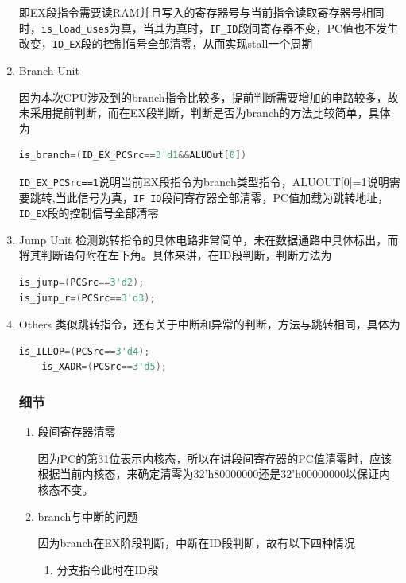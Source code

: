 \documentclass{ctexart}
\begin{document}
\begin{enumerate}
即EX段指令需要读RAM并且写入的寄存器号与当前指令读取寄存器号相同时，\verb"is_load_uses"为真，当其为真时，\verb"IF_ID"段间寄存器不变，PC值也不发生改变，\verb"ID_EX"段的控制信号全部清零，从而实现stall一个周期

	\item Branch Unit

因为本次CPU涉及到的branch指令比较多，提前判断需要增加的电路较多，故未采用提前判断，而在EX段判断，判断是否为branch的方法比较简单，具体为

\begin{lstlisting}[language = verilog]
is_branch=(ID_EX_PCSrc==3'd1&&ALUOut[0])
\end{lstlisting}

\verb"ID_EX_PCSrc==1"说明当前EX段指令为branch类型指令，ALUOUT[0]=1说明需要跳转,当此信号为真，\verb"IF_ID"段间寄存器全部清零，PC值加载为跳转地址，\verb"ID_EX"段的控制信号全部清零

	\item Jump Unit
检测跳转指令的具体电路非常简单，未在数据通路中具体标出，而将其判断语句附在左下角。具体来讲，在ID段判断，判断方法为

\begin{lstlisting}[language = verilog]
is_jump=(PCSrc==3'd2);
is_jump_r=(PCSrc==3'd3);
\end{lstlisting}

	\item Others
	类似跳转指令，还有关于中断和异常的判断，方法与跳转相同，具体为

\begin{lstlisting}[language = verilog]
	is_ILLOP=(PCSrc==3'd4);
	is_XADR=(PCSrc==3'd5);
\end{lstlisting}

	\subsubsection{细节}
\begin{enumerate}
\item 段间寄存器清零

因为PC的第31位表示内核态，所以在讲段间寄存器的PC值清零时，应该根据当前内核态，来确定清零为32’h80000000还是32’h00000000以保证内核态不变。

\item branch与中断的问题

因为branch在EX阶段判断，中断在ID段判断，故有以下四种情况

\begin{enumerate}
\item 分支指令此时在ID段


\end{enumerate}
\end{enumerate}
\end{enumerate}
\end{document}
